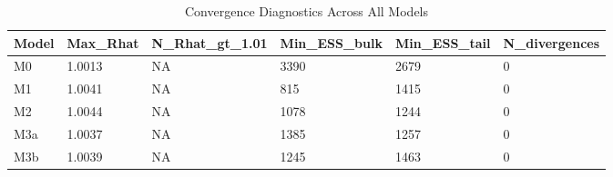 \begin{table}[htbp]
\centering
\begin{tabular}{llllll}
  \toprule
Model & Max_Rhat & N_Rhat_gt_1.01 & Min_ESS_bulk & Min_ESS_tail & N_divergences \\ 
  \midrule
M0 & 1.0013 & NA & 3390 & 2679 & 0 \\ 
  M1 & 1.0041 & NA & 815 & 1415 & 0 \\ 
  M2 & 1.0044 & NA & 1078 & 1244 & 0 \\ 
  M3a & 1.0037 & NA & 1385 & 1257 & 0 \\ 
  M3b & 1.0039 & NA & 1245 & 1463 & 0 \\ 
   \bottomrule
\end{tabular}
\caption{Convergence Diagnostics Across All Models} 
\end{table}

